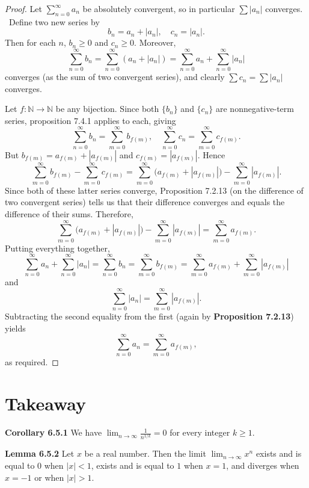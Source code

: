 \documentclass{article}
\begin{document}
\begin{proof}
    Let $\sum_{n=0}^\infty a_n$ be absolutely convergent, so in particular $\sum |a_n|$ converges. \
    Define two new series by
    \[
        b_n = a_n + |a_n|, \quad c_n = |a_n|.
    \]
    Then for each \( n \), \( b_n \geq 0 \) and \( c_n \geq 0 \).
    Moreover,
    \[
        \sum_{n=0}^\infty b_n = \sum_{n=0}^\infty (a_n + |a_n|) = \sum_{n=0}^\infty a_n + \sum_{n=0}^\infty |a_n|
    \]
    converges (as the sum of two convergent series), and clearly \( \sum c_n = \sum |a_n| \) converges.

    Let \( f: \mathbb{N} \to \mathbb{N} \) be any bijection.
    Since both \( \{b_n\} \) and \( \{c_n\} \) are nonnegative-term series,
    proposition 7.4.1 applies to each, giving
    \[
        \sum_{n=0}^\infty b_n = \sum_{m=0}^\infty b_{f(m)}, \quad \sum_{n=0}^\infty c_n = \sum_{m=0}^\infty c_{f(m)}.
    \]
    But \( b_{f(m)} = a_{f(m)} + |a_{f(m)}| \) and \( c_{f(m)} = |a_{f(m)}| \).
    Hence
    \[
        \sum_{m=0}^\infty b_{f(m)} - \sum_{m=0}^\infty c_{f(m)} = \sum_{m=0}^\infty \bigl(a_{f(m)} + |a_{f(m)}|\bigr) - \sum_{m=0}^\infty |a_{f(m)}|.
    \]
    Since both of these latter series converge,
    Proposition 7.2.13 (on the difference of two convergent series)
    tells us that their difference converges and equals the difference of their sums.
    Therefore,
    \[
        \sum_{m=0}^\infty \bigl(a_{f(m)} + |a_{f(m)}|\bigr) - \sum_{m=0}^\infty |a_{f(m)}| = \sum_{m=0}^\infty a_{f(m)}.
    \]
    Putting everything together,
    \[
        \sum_{n=0}^\infty a_n + \sum_{n=0}^\infty |a_n| = \sum_{n=0}^\infty b_n = \sum_{m=0}^\infty b_{f(m)} = \sum_{m=0}^\infty a_{f(m)} + \sum_{m=0}^\infty |a_{f(m)}|
    \]
    and
    \[
        \sum_{n=0}^\infty |a_n| = \sum_{m=0}^\infty |a_{f(m)}|.
    \]
    Subtracting the second equality from the first (again by \textbf{Proposition 7.2.13}) yields
    \[
        \sum_{n=0}^\infty a_n = \sum_{m=0}^\infty a_{f(m)},
    \]
    as required.
\end{proof}




\section{Takeaway}
\textbf{Corollary 6.5.1} We have
\(\lim_{n \to \infty} \frac{1}{n^{1/k}} = 0\) for every integer \( k \geq 1\).

\medskip

\textbf{Lemma 6.5.2} Let $x$ be a real number. Then the limit
$\lim_{n \to \infty} x^n$ exists and is equal to $0$ when $|x| < 1$,
exists and is equal to $1$ when $x = 1$, and diverges when $x = -1$
or when $|x| > 1$.
\end{document}
